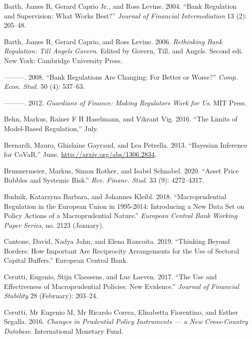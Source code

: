 \documentclass[
  10pt,
]{article}
\begin{document}
\leavevmode\hypertarget{ref-Barth2004}{}%
Barth, James R, Gerard Caprio Jr., and Ross Levine. 2004. ``Bank
Regulation and Supervision: What Works Best?'' \emph{Journal of
Financial Intermediation} 13 (2): 205--48.

\leavevmode\hypertarget{ref-Barth2006}{}%
Barth, James R, Gerard Caprio, and Ross Levine. 2006. \emph{Rethinking
Bank Regulation: Till Angels Govern}. Edited by Govern, Till, and
Angels. Second edi. New York: Cambridge University Press.

\leavevmode\hypertarget{ref-Barth2008}{}%
---------. 2008. ``Bank Regulations Are Changing: For Better or Worse?''
\emph{Comp. Econ. Stud.} 50 (4): 537--63.

\leavevmode\hypertarget{ref-Barth2012}{}%
---------. 2012. \emph{Guardians of Finance: Making Regulators Work for
Us}. MIT Press.

\leavevmode\hypertarget{ref-Behn2016}{}%
Behn, Markus, Rainer F H Haselmann, and Vikrant Vig. 2016. ``The Limits
of Model-Based Regulation,'' July.

\leavevmode\hypertarget{ref-Bernardi2013}{}%
Bernardi, Mauro, Ghislaine Gayraud, and Lea Petrella. 2013. ``Bayesian
Inference for CoVaR,'' June. \url{http://arxiv.org/abs/1306.2834}.

\leavevmode\hypertarget{ref-Brunnermeier2020}{}%
Brunnermeier, Markus, Simon Rother, and Isabel Schnabel. 2020. ``Asset
Price Bubbles and Systemic Risk.'' \emph{Rev. Financ. Stud.} 33 (9):
4272--4317.

\leavevmode\hypertarget{ref-Budnik2018}{}%
Budnik, Katarzyna Barbara, and Johannes Kleibl. 2018. ``Macroprudential
Regulation in the European Union in 1995-2014: Introducing a New Data
Set on Policy Actions of a Macroprudential Nature.'' \emph{European
Central Bank Working Paper Series}, no. 2123 (January).

\leavevmode\hypertarget{ref-Cantone2019}{}%
Cantone, David, Nadya Jahn, and Elena Rancoita. 2019. ``Thinking Beyond
Borders: How Important Are Reciprocity Arrangements for the Use of
Sectoral Capital Buffers.'' European Central Bank.

\leavevmode\hypertarget{ref-Cerutti2017}{}%
Cerutti, Eugenio, Stijn Claessens, and Luc Laeven. 2017. ``The Use and
Effectiveness of Macroprudential Policies: New Evidence.'' \emph{Journal
of Financial Stability} 28 (February): 203--24.

\leavevmode\hypertarget{ref-Cerutti2016}{}%
Cerutti, Mr Eugenio M, Mr Ricardo Correa, Elisabetta Fiorentino, and
Esther Segalla. 2016. \emph{Changes in Prudential Policy Instruments ---
a New Cross-Country Database}. International Monetary Fund.
\end{document}
